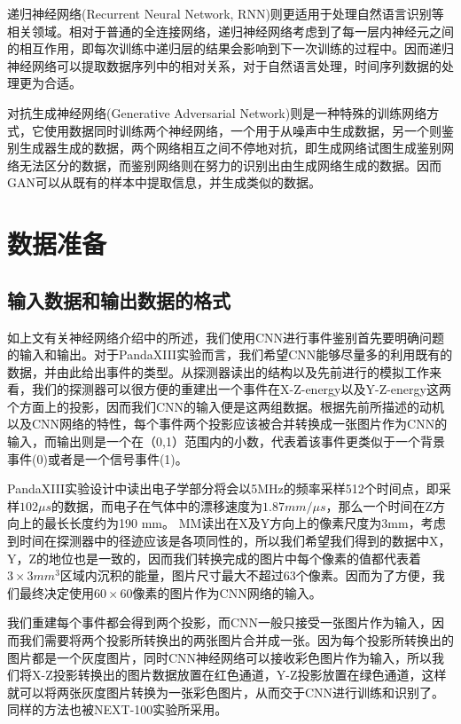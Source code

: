 递归神经网络(Recurrent Neural Network, RNN)则更适用于处理自然语言识别等相关领域。相对于普通的全连接网络，递归神经网络考虑到了每一层内神经元之间的相互作用，即每次训练中递归层的结果会影响到下一次训练的过程中。因而递归神经网络可以提取数据序列中的相对关系，对于自然语言处理，时间序列数据的处理更为合适。

对抗生成神经网络(Generative Adversarial Network)则是一种特殊的训练网络方式，它使用数据同时训练两个神经网络，一个用于从噪声中生成数据，另一个则鉴别生成器生成的数据，两个网络相互之间不停地对抗，即生成网络试图生成鉴别网络无法区分的数据，而鉴别网络则在努力的识别出由生成网络生成的数据。因而GAN可以从既有的样本中提取信息，并生成类似的数据。

\section{数据准备}
\label{section:data_prepare}

\subsection{输入数据和输出数据的格式}
如上文有关神经网络介绍中的所述，我们使用CNN进行事件鉴别首先要明确问题的输入和输出。对于PandaXIII实验而言，我们希望CNN能够尽量多的利用既有的数据，并由此给出事件的类型。从探测器读出的结构以及先前进行的模拟工作来看，我们的探测器可以很方便的重建出一个事件在X-Z-energy以及Y-Z-energy这两个方面上的投影，因而我们CNN的输入便是这两组数据。根据先前所描述的动机以及CNN网络的特性，每个事件两个投影应该被合并转换成一张图片作为CNN的输入，而输出则是一个在（0,1）范围内的小数，代表着该事件更类似于一个背景事件(0)或者是一个信号事件(1)。

PandaXIII实验设计中读出电子学部分将会以5MHz的频率采样512个时间点，即采样$102\mu s$的数据，而电子在气体中的漂移速度为$1.87 mm/ \mu s$，那么一个时间在Z方向上的最长长度约为190 mm。 MM读出在X及Y方向上的像素尺度为3mm，考虑到时间在探测器中的径迹应该是各项同性的，所以我们希望我们得到的数据中X，Y，Z的地位也是一致的，因而我们转换完成的图片中每个像素的值都代表着$3\times 3mm^3$区域内沉积的能量，图片尺寸最大不超过63个像素。因而为了方便，我们最终决定使用$60\times60$像素的图片作为CNN网络的输入。

我们重建每个事件都会得到两个投影，而CNN一般只接受一张图片作为输入，因而我们需要将两个投影所转换出的两张图片合并成一张。因为每个投影所转换出的图片都是一个灰度图片，同时CNN神经网络可以接收彩色图片作为输入，所以我们将X-Z投影转换出的图片数据放置在红色通道，Y-Z投影放置在绿色通道，这样就可以将两张灰度图片转换为一张彩色图片，从而交于CNN进行训练和识别了。同样的方法也被NEXT-100实验所采用\supercite{renner2017background}。

